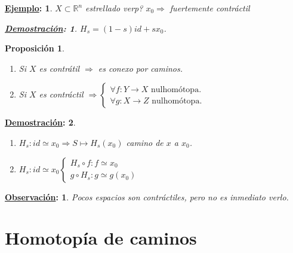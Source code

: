 \documentclass[10pt,a4paper,openright]{book}
\theoremstyle{break}
\newtheorem*{prop}{Proposición}
\newtheorem*{demo}{\underline{Demostración}:}
\newtheorem*{obs}{\underline{Observación}:}
\newtheorem*{ej}{\underline{Ejemplo}:}
\begin{document}
\begin{ej}
    $X \subset \mathbb{R}^n$ estrellado verp? $x_0 \Rightarrow$ fuertemente contráctil
    \begin{demo}
        $H_s = \left( 1 - s \right) id + sx_0$.
    \end{demo}
\end{ej}

\begin{prop}
\begin{enumerate}
    \item Si $X$ es contrátil $\Rightarrow$ es conexo por caminos.
    \item Si $X$ es contráctil $\Rightarrow \begin{cases}
        \forall f: Y \rightarrow X \text{ nulhomótopa.}\\
        \forall g: X \rightarrow Z \text{ nulhomótopa.} 
    \end{cases} $
\end{enumerate}
\end{prop}
\begin{demo}
\begin{enumerate}
    \item $H_s: id \simeq x_0 \Rightarrow S \mapsto H_s\left( x_0 \right)$ camino de $x$ a $x_0$.
    \item $H_s: id \simeq x_0 \begin{cases}
        H_s \circ f: f \simeq x_0\\
        g \circ H_s: g \simeq g\left( x_0 \right) 
    \end{cases} $
\end{enumerate}
\end{demo}
\begin{obs}
Pocos espacios son contráctiles, pero no es inmediato verlo.
\end{obs}

\chapter{Homotopía de caminos}%
\label{cha:homotopia_de_caminos}
\end{document}
